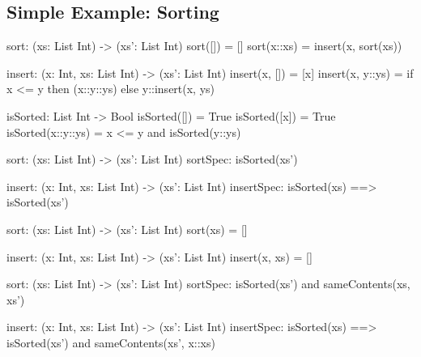 \documentclass[notes=hide]{beamer}
\begin{document}
\subsection{Simple Example: Sorting}

\begin{frame}[fragile]{\secname}{\subsecname}
\begin{semiverbatim}
sort: (xs: List Int) -> (xs': List Int)
sort([])    = []
sort(x::xs) = insert(x, sort(xs))

insert: (x: Int, xs: List Int) -> (xs': List Int)
insert(x, [])    = [x]
insert(x, y::ys) = if x <= y then (x::y::ys)
                             else y::insert(x, ys)
\end{semiverbatim}
\end{frame}

\begin{frame}[fragile]{\secname}{\subsecname}
\begin{semiverbatim}
isSorted: List Int -> Bool
isSorted([])       = True
isSorted([x])      = True
isSorted(x::y::ys) = x <= y and isSorted(y::ys)
\end{semiverbatim}
\end{frame}

\begin{frame}[fragile]{\secname}{\subsecname}
\begin{semiverbatim}
sort: (xs: List Int) -> (xs': List Int)
sortSpec: isSorted(xs')

insert: (x: Int, xs: List Int) -> (xs': List Int)
insertSpec: isSorted(xs) ==> isSorted(xs')
\end{semiverbatim}
\end{frame}

\begin{frame}[fragile]{\secname}{\subsecname}
\begin{semiverbatim}
sort: (xs: List Int) -> (xs': List Int)
sort(xs) = []

insert: (x: Int, xs: List Int) -> (xs': List Int)
insert(x, xs) = []
\end{semiverbatim}
\end{frame}

\begin{frame}[fragile]{\secname}{\subsecname}
\begin{semiverbatim}
sort: (xs: List Int) -> (xs': List Int)
sortSpec: isSorted(xs') and sameContents(xs, xs')

insert: (x: Int, xs: List Int) -> (xs': List Int)
insertSpec: isSorted(xs) ==>
  isSorted(xs') and sameContents(xs', x::xs)
\end{semiverbatim}
\end{frame}
\end{document}
